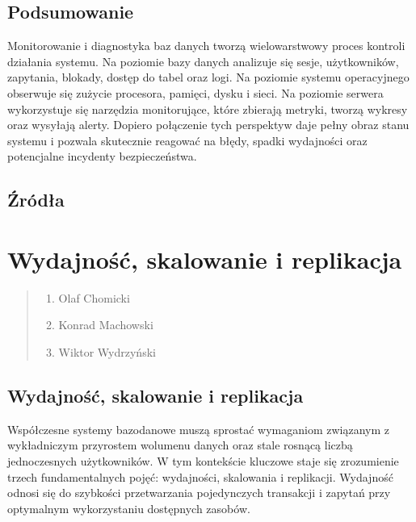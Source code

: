 \documentclass[a4paper,11pt,english,openany,oneside]{sphinxmanual}
\begin{document}
\subsection{Podsumowanie}
\label{\detokenize{rozdzial_2/rozdzial_24/index:podsumowanie}}
\sphinxAtStartPar
Monitorowanie i diagnostyka baz danych tworzą wielowarstwowy proces kontroli działania systemu. Na poziomie bazy danych analizuje się sesje, użytkowników, zapytania, blokady, dostęp do tabel oraz logi. Na poziomie systemu operacyjnego obserwuje się zużycie procesora, pamięci, dysku i sieci. Na poziomie serwera wykorzystuje się narzędzia monitorujące, które zbierają metryki, tworzą wykresy oraz wysyłają alerty. Dopiero połączenie tych perspektyw daje pełny obraz stanu systemu i pozwala skutecznie reagować na błędy, spadki wydajności oraz potencjalne incydenty bezpieczeństwa.


\subsection{Źródła}
\label{\detokenize{rozdzial_2/rozdzial_24/index:zrodla}}
\sphinxstepscope


\section{Wydajność, skalowanie i replikacja}
\label{\detokenize{rozdzial_2/rozdzial_25/index:wydajnosc-skalowanie-i-replikacja}}\label{\detokenize{rozdzial_2/rozdzial_25/index::doc}}\begin{quote}\begin{description}
\begin{enumerate}
%
\item {} 
\sphinxAtStartPar
Olaf Chomicki

\item {} 
\sphinxAtStartPar
Konrad Machowski

\item {} 
\sphinxAtStartPar
Wiktor Wydrzyński

\end{enumerate}

\end{description}\end{quote}


\subsection{Wydajność, skalowanie i replikacja}
\label{\detokenize{rozdzial_2/rozdzial_25/index:id1}}
\sphinxAtStartPar
Współczesne systemy bazodanowe muszą sprostać wymaganiom związanym z wykładniczym przyrostem wolumenu danych oraz stale rosnącą liczbą jednoczesnych użytkowników. W tym kontekście kluczowe staje się zrozumienie trzech fundamentalnych pojęć: wydajności, skalowania i replikacji. Wydajność odnosi się do szybkości przetwarzania pojedynczych transakcji i zapytań przy optymalnym wykorzystaniu dostępnych zasobów.
\end{document}
